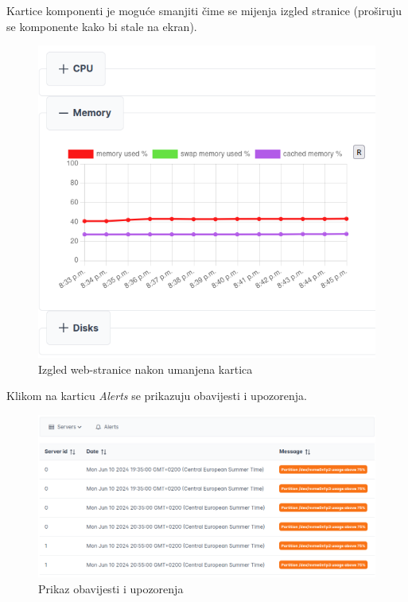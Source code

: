 \documentclass[zavrsnirad]{fer}
\begin{document}
Kartice komponenti je moguće smanjiti čime se mijenja izgled stranice (proširuju se komponente kako bi stale na ekran).
\begin{figure}[htb]
	\centering
	\includegraphics[width=0.75\linewidth]{images/web_4.png} 
	\caption{Izgled web-stranice nakon umanjena kartica}
\end{figure}
\FloatBarrier

Klikom na karticu \textit{Alerts} se prikazuju obavijesti i upozorenja.
\begin{figure}[htb]
	\centering
	\includegraphics[width=0.9\linewidth]{images/web_5.png} 
	\caption{Prikaz obavijesti i upozorenja}
\end{figure}
\FloatBarrier
\end{document}
